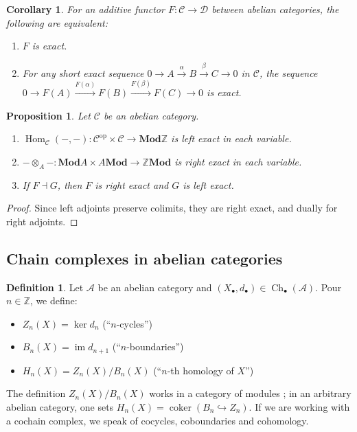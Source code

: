 \documentclass{article}
\newcommand{\op}{\mathrm{op}}
\newcommand{\Z}{\mathbb{Z}}
\newcommand{\cat}{\mathcal{C}}
\newcommand{\catt}{\mathcal{D}}
\newcommand{\Acat}{\mathcal{A}}
\newcommand{\Mod}{\mathbf{Mod}}
\DeclareMathOperator{\Ch}{Ch}
\DeclareMathOperator{\Hom}{Hom}
\DeclareMathOperator{\coker}{coker}
\DeclareMathOperator{\im}{im}
\theoremstyle{plain}
\newtheorem{proposition}[theorem]{Proposition}
\newtheorem{corollary}[theorem]{Corollary}
\theoremstyle{definition}
\newtheorem{definition}[theorem]{Definition}
\theoremstyle{remark}
\begin{document}
\begin{corollary}
    For an additive functor $F : \cat \to \catt$ between abelian categories, the following are equivalent:
    \begin{enumerate}
        \item $F$ is exact.
        \item For any short exact sequence $0 \to A \xrightarrow{\alpha} B \xrightarrow{\beta} C\to 0$ in $\cat$, the sequence $0 \to F(A) \xrightarrow{F(\alpha)} F(B) \xrightarrow{F(\beta)} F(C) \to 0$ is exact.
    \end{enumerate}
\end{corollary}

\begin{proposition} 
    Let $\cat$ be an abelian category.
    \begin{enumerate}
        \item $\Hom_\cat (-,-) : \cat^\op \times \cat \to \Mod \Z$ is left exact in each variable.
        \item $- \otimes_A - : \Mod A \times A \Mod \to \Z \Mod$ is right exact in each variable.
        \item If $F \dashv G$, then $F$ is right exact and $G$ is left exact.
    \end{enumerate}
\end{proposition}

\begin{proof}
    Since left adjoints preserve colimits, they are right exact, and dually for right adjoints.
\end{proof}

\subsection{Chain complexes in abelian categories}

\begin{definition}
    Let $\Acat$ be an abelian category and $(X_\bullet, d_\bullet) \in \Ch_\bullet (\Acat)$. Pour $n \in \Z$, we define:
    \begin{itemize}
        \item $Z_n(X) = \ker d_n$ (``$n$-cycles'')
        \item $B_n(X) = \im d_{n+1}$ (``$n$-boundaries'')
        \item $H_n(X) = Z_n(X)/B_n(X)$ (``$n$-th homology of $X$'')
    \end{itemize}
    The definition $Z_n(X)/B_n(X)$ works in a category of modules ; in an arbitrary abelian category, one sets $H_n(X) = \coker(B_n \hookrightarrow Z_n)$. If we are working with a cochain complex, we speak of cocycles, coboundaries and cohomology.
\end{definition}
\end{document}
